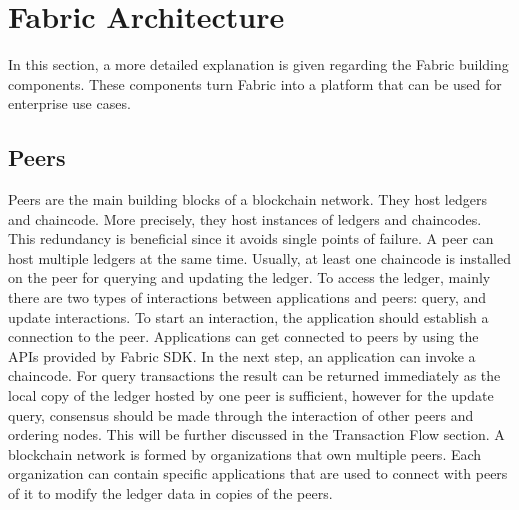 \documentclass[sigconf,natbib=false]{acmart}
\begin{document}
    \section{Fabric Architecture}
    In this section, a more detailed explanation is given regarding the Fabric building components. These components turn Fabric into a platform that can be used for enterprise use cases.
    \subsection{Peers}
    Peers are the main building blocks of a blockchain network. They host ledgers and chaincode. More precisely, they host instances of ledgers and chaincodes. This redundancy is beneficial since it avoids single points of failure. A peer can host multiple ledgers at the same time. Usually, at least one chaincode is installed on the peer for querying and updating the ledger. To access the ledger, mainly there are two types of interactions between applications and peers:  query, and update interactions. To start an interaction, the application should establish a connection to the peer. Applications can get connected to peers by using the APIs provided by Fabric SDK. In the next step, an application can invoke a chaincode. For query transactions the result can be returned immediately as the local copy of the ledger hosted by one peer is sufficient, however for the update query, consensus should be made through the interaction of other peers and ordering nodes. This will be further discussed in the Transaction Flow section.
    A blockchain network is formed by organizations that own multiple peers. Each organization can contain specific applications that are used to connect with peers of it to modify the ledger data in copies of the peers.\cite{peer}
\end{document}
